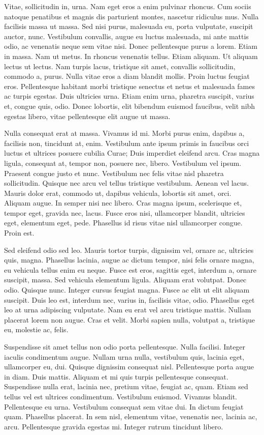 \documentclass[
  a4paper,
  12pt,
  twoside
]{memoir}
\author{YOUR NAME HERE}
\begin{document}
Vitae, sollicitudin in, urna. Nam eget eros a enim pulvinar rhoncus. Cum sociis
natoque penatibus et magnis dis parturient montes, nascetur ridiculus mus. Nulla
facilisis massa ut massa. Sed nisi purus, malesuada eu, porta vulputate,
suscipit auctor, nunc. Vestibulum convallis, augue eu luctus malesuada, mi ante
mattis odio, ac venenatis neque sem vitae nisi. Donec pellentesque purus a
lorem. Etiam in massa. Nam ut metus. In rhoncus venenatis tellus. Etiam aliquam.
Ut aliquam lectus ut lectus. Nam turpis lacus, tristique sit amet, convallis
sollicitudin, commodo a, purus. Nulla vitae eros a diam blandit mollis. Proin
luctus feugiat eros. Pellentesque habitant morbi tristique senectus et netus et
malesuada fames ac turpis egestas. Duis ultricies urna. Etiam enim urna,
pharetra suscipit, varius et, congue quis, odio. Donec lobortis, elit bibendum
euismod faucibus, velit nibh egestas libero, vitae pellentesque elit augue ut
massa.

Nulla consequat erat at massa. Vivamus id mi. Morbi purus enim, dapibus a,
facilisis non, tincidunt at, enim. Vestibulum ante ipsum primis in faucibus orci
luctus et ultrices posuere cubilia Curae; Duis imperdiet eleifend arcu. Cras
magna ligula, consequat at, tempor non, posuere nec, libero. Vestibulum vel
ipsum. Praesent congue justo et nunc. Vestibulum nec felis vitae nisl pharetra
sollicitudin. Quisque nec arcu vel tellus tristique vestibulum. Aenean vel
lacus. Mauris dolor erat, commodo ut, dapibus vehicula, lobortis sit amet, orci.
Aliquam augue. In semper nisi nec libero. Cras magna ipsum, scelerisque et,
tempor eget, gravida nec, lacus. Fusce eros nisi, ullamcorper blandit, ultricies
eget, elementum eget, pede. Phasellus id risus vitae nisl ullamcorper congue.
Proin est.

Sed eleifend odio sed leo. Mauris tortor turpis, dignissim vel, ornare ac,
ultricies quis, magna. Phasellus lacinia, augue ac dictum tempor, nisi felis
ornare magna, eu vehicula tellus enim eu neque. Fusce est eros, sagittis eget,
interdum a, ornare suscipit, massa. Sed vehicula elementum ligula. Aliquam erat
volutpat. Donec odio. Quisque nunc. Integer cursus feugiat magna. Fusce ac elit
ut elit aliquam suscipit. Duis leo est, interdum nec, varius in, facilisis
vitae, odio. Phasellus eget leo at urna adipiscing vulputate. Nam eu erat vel
arcu tristique mattis. Nullam placerat lorem non augue. Cras et velit. Morbi
sapien nulla, volutpat a, tristique eu, molestie ac, felis.

Suspendisse sit amet tellus non odio porta pellentesque. Nulla facilisi. Integer
iaculis condimentum augue. Nullam urna nulla, vestibulum quis, lacinia eget,
ullamcorper eu, dui. Quisque dignissim consequat nisl. Pellentesque porta augue
in diam. Duis mattis. Aliquam et mi quis turpis pellentesque consequat.
Suspendisse nulla erat, lacinia nec, pretium vitae, feugiat ac, quam. Etiam sed
tellus vel est ultrices condimentum. Vestibulum euismod. Vivamus blandit.
Pellentesque eu urna. Vestibulum consequat sem vitae dui. In dictum feugiat
quam. Phasellus placerat. In sem nisl, elementum vitae, venenatis nec, lacinia
ac, arcu. Pellentesque gravida egestas mi. Integer rutrum tincidunt libero.
\end{document}
